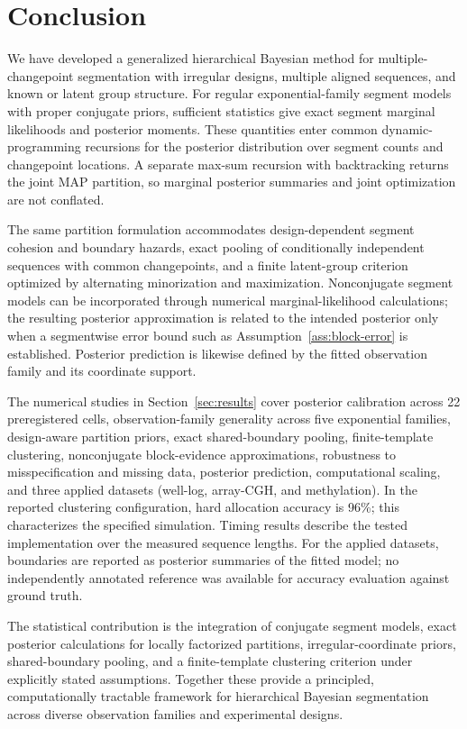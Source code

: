 \section{Conclusion}
\label{sec:conclusion}

We have developed a generalized hierarchical Bayesian method for multiple-changepoint segmentation with irregular designs, multiple aligned sequences, and known or latent group structure. For regular exponential-family segment models with proper conjugate priors, sufficient statistics give exact segment marginal likelihoods and posterior moments. These quantities enter common dynamic-programming recursions for the posterior distribution over segment counts and changepoint locations. A separate max-sum recursion with backtracking returns the joint MAP partition, so marginal posterior summaries and joint optimization are not conflated.

The same partition formulation accommodates design-dependent segment cohesion and boundary hazards, exact pooling of conditionally independent sequences with common changepoints, and a finite latent-group criterion optimized by alternating minorization and maximization. Nonconjugate segment models can be incorporated through numerical marginal-likelihood calculations; the resulting posterior approximation is related to the intended posterior only when a segmentwise error bound such as Assumption~\ref{ass:block-error} is established. Posterior prediction is likewise defined by the fitted observation family and its coordinate support.

The numerical studies in Section~\ref{sec:results} cover posterior calibration across 22 preregistered cells, observation-family generality across five exponential families, design-aware partition priors, exact shared-boundary pooling, finite-template clustering, nonconjugate block-evidence approximations, robustness to misspecification and missing data, posterior prediction, computational scaling, and three applied datasets (well-log, array-CGH, and methylation). In the reported clustering configuration, hard allocation accuracy is 96\%; this characterizes the specified simulation. Timing results describe the tested implementation over the measured sequence lengths. For the applied datasets, boundaries are reported as posterior summaries of the fitted model; no independently annotated reference was available for accuracy evaluation against ground truth.

The statistical contribution is the integration of conjugate segment models, exact posterior calculations for locally factorized partitions, irregular-coordinate priors, shared-boundary pooling, and a finite-template clustering criterion under explicitly stated assumptions. Together these provide a principled, computationally tractable framework for hierarchical Bayesian segmentation across diverse observation families and experimental designs.

